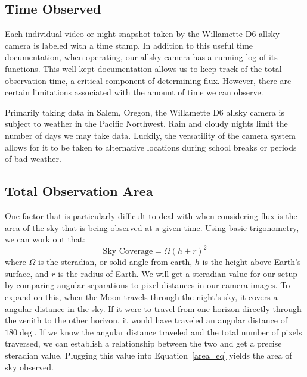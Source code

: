 \subsection{Time Observed}

Each individual video or night snapshot taken by the Willamette D6 allsky camera is labeled with a time stamp.  
In addition to this useful time documentation, when operating, our allsky camera has a running log of its functions.
This well-kept documentation allows us to keep track of the total observation time, a critical component of determining flux.  
However, there are certain limitations associated with the amount of time we can observe.

Primarily taking data in Salem, Oregon, the Willamette D6 allsky camera is subject to weather in the Pacific Northwest.  
Rain and cloudy nights limit the number of days we may take data.
Luckily, the versatility of the camera system allows for it to be taken to alternative locations during school breaks or periods of bad weather.


\subsection{Total Observation Area}
One factor that is particularly difficult to deal with when considering flux is the area of the sky that is being observed at a given time.
Using basic trigonometry, we can work out that:
\begin{equation}
    \text{Sky Coverage} = \Omega(h+r)^2
    \label{area_eq}
\end{equation}
where $\Omega$ is the steradian, or solid angle from earth, $h$ is the height above Earth's surface, and $r$ is the radius of Earth.
We will get a steradian value for our setup by comparing angular separations to pixel distances in our camera images.
To expand on this, when the Moon travels through the night's sky, it covers a angular distance in the sky.  
If it were to travel from one horizon directly through the zenith to the other horizon, it would have traveled an angular distance of $180 \deg$.  
If we know the angular distance traveled and the total number of pixels traversed, we can establish a relationship between the two and get a precise steradian value. 
Plugging this value into Equation~\ref{area_eq} yields the area of sky observed.

